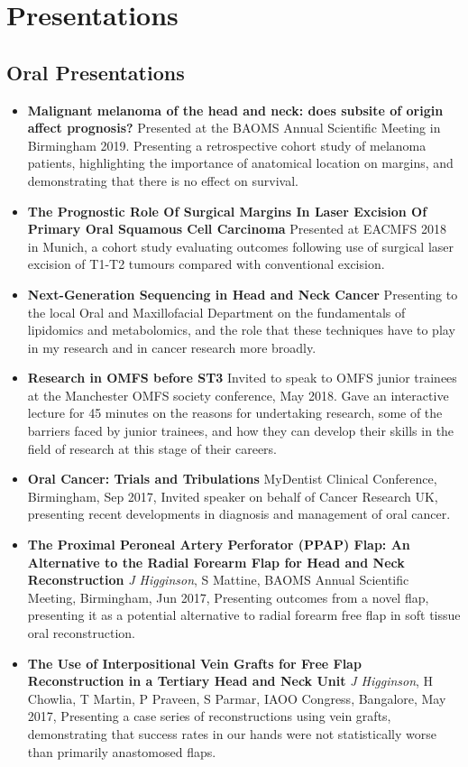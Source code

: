 \section*{Presentations}
\subsection*{Oral Presentations}
\begin{itemize}
	\item\textbf{Malignant melanoma of the head and neck: does subsite of origin affect prognosis?} Presented at the BAOMS Annual Scientific Meeting in Birmingham 2019. Presenting a retrospective cohort study of melanoma patients, highlighting the importance of anatomical location on margins, and demonstrating that there is no effect on survival.
        \item\textbf{The Prognostic Role Of Surgical Margins In Laser Excision Of Primary Oral Squamous Cell Carcinoma} Presented at EACMFS 2018 in Munich, a cohort study evaluating outcomes following use of surgical laser excision of T1-T2 tumours compared with conventional excision.
        \item\textbf{Next-Generation Sequencing in Head and Neck Cancer} Presenting to the local Oral and Maxillofacial Department on the fundamentals of lipidomics and metabolomics, and the role that these techniques have to play in my research and in cancer research more broadly.
        \item\textbf{Research in OMFS before ST3} Invited to speak to OMFS junior trainees at the Manchester OMFS society conference, May 2018. Gave an interactive lecture for 45 minutes on the reasons for undertaking research, some of the barriers faced by junior trainees, and how they can develop their skills in the field of research at this stage of their careers.
        \item\textbf{Oral Cancer: Trials and Tribulations} MyDentist Clinical Conference, Birmingham, Sep 2017, Invited speaker on behalf of Cancer Research UK, presenting recent developments in diagnosis and management of oral cancer.
        \item\textbf{The Proximal Peroneal Artery Perforator (PPAP) Flap: An Alternative to the Radial Forearm Flap for Head and Neck Reconstruction} \emph{J Higginson}, S Mattine, BAOMS Annual Scientific Meeting, Birmingham, Jun 2017, Presenting outcomes from a novel flap, presenting it as a potential alternative to radial forearm free flap in soft tissue oral reconstruction.
        \item\textbf{The Use of Interpositional Vein Grafts for Free Flap Reconstruction in a Tertiary Head and Neck Unit} \emph{J Higginson}, H Chowlia, T Martin, P Praveen, S Parmar, IAOO Congress, Bangalore, May 2017, Presenting a case series of reconstructions using vein grafts, demonstrating that success rates in our hands were not statistically worse than primarily anastomosed flaps.

\end{itemize}
